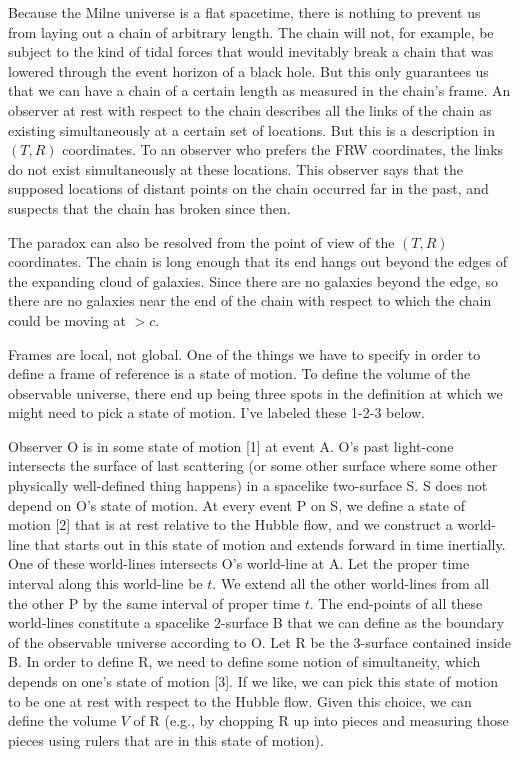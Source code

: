 Because the Milne universe is a flat spacetime, there is nothing to prevent us from laying out a chain
of arbitrary length. The chain will not, for example, be subject to the kind of tidal forces that
would inevitably break a chain that was lowered through the event horizon of a black hole. But this
only guarantees us that we can have a chain of a certain length as measured in the chain's frame.
An observer at rest with respect to the chain describes all the links of the chain as existing
simultaneously at a certain set of locations. But this is a description in $(T,R)$ coordinates.
To an observer who prefers the FRW coordinates, the links do not exist simultaneously at these
locations. This observer says that the supposed locations of distant points on the chain occurred far in
the past, and suspects that the chain has broken since then.

The paradox can also be resolved from the point of view of the $(T,R)$ coordinates. The chain is
long enough that its end hangs out beyond the edges of the expanding cloud of galaxies. Since there are no galaxies beyond
the edge, so there are no galaxies near the end of the chain with respect to which the chain could be moving at $>c$.

Frames are local, not global. One of the things we have to
specify in order to define a frame of reference is a state of motion.
To define the volume of the observable universe, there end up being
three spots in the definition at which we might need to pick a state
of motion. I've labeled these 1-2-3 below.

Observer O is in some state of motion [1] at event A. O's past
light-cone intersects the surface of last scattering (or some other
surface where some other physically well-defined thing happens) in a
spacelike two-surface S. S does not depend on O's state of motion. At
every event P on S, we define a state of motion [2] that is at rest
relative to the Hubble flow, and we construct a world-line that
starts out in this state of motion and extends forward in time
inertially. One of these world-lines intersects O's world-line at A.
Let the proper time interval along this world-line be $t$. We extend
all the other world-lines from all the other P by the same interval
of proper time $t$. The end-points of all these world-lines constitute
a spacelike 2-surface B that we can define as the boundary of the
observable universe according to O. Let R be the 3-surface contained
inside B. In order to define R, we need to define some notion of
simultaneity, which depends on one's state of motion [3]. If we like,
we can pick this state of motion to be one at rest with respect to
the Hubble flow. Given this choice, we can define the volume $V$ of R
(e.g., by chopping R up into pieces and measuring those pieces using
rulers that are in this state of motion).

